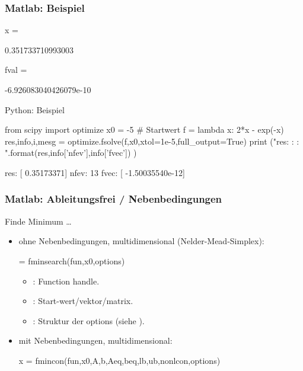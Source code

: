 \documentclass[hyperref={xetex}]{beamer}
\begin{document}
\begin{frame}[fragile]\frametitle{Matlab: Beispiel}
\begin{matlab}
x =

   0.351733710993003

fval =

    -6.926083040426079e-10
\end{matlab}

\end{frame}

\begin{frame}[fragile]{Python: Beispiel}
  \begin{pyin}
from scipy import optimize
x0 = -5  # Startwert
f = lambda x: 2*x - exp(-x)
res,info,i,mesg = optimize.fsolve(f,x0,xtol=1e-5,full_output=True) 
print ("res: {} \nnfev: {} \nfvec: {}".format(res,info['nfev'],info['fvec']) )
  \end{pyin}
  \begin{pyout}
res: [ 0.35173371]
nfev: 13 
fvec: [ -1.50035540e-12]
  \end{pyout}
\end{frame}

\begin{frame}[fragile]\frametitle{Matlab: Ableitungsfrei / Nebenbedingungen}
Finde Minimum \ldots 

\begin{itemize}
  \item 
ohne Nebenbedingungen, multidimensional (Nelder-Mead-Simplex):
\begin{matlabin}
  = fminsearch(fun,x0,options)
\end{matlabin}
\begin{itemize}
 \item {}: Function handle.
\item {}: Start-wert/vektor/matrix.
\item {}: Struktur der options (siehe ).
\end{itemize}

\item mit Nebenbedingungen, multidimensional:
\begin{matlabin}
x = fmincon(fun,x0,A,b,Aeq,beq,lb,ub,nonlcon,options)
\end{matlabin}
\end{itemize}

\end{frame}
\end{document}
